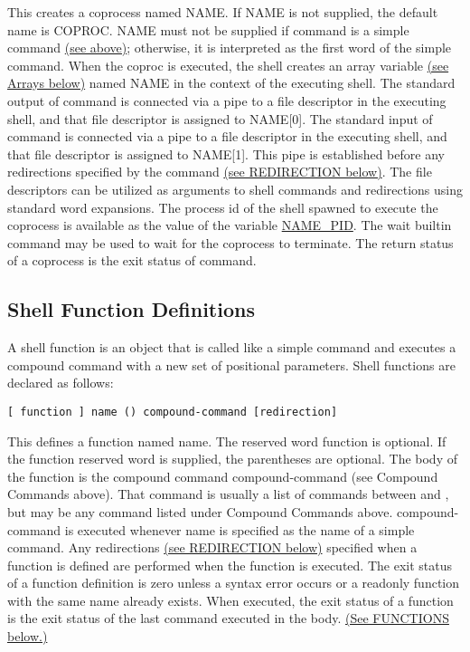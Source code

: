 \documentclass[11pt]{article}
\begin{document}
This creates a coprocess named NAME. If NAME is not supplied, the default name is COPROC. NAME must not be supplied if command is a simple command \hyperref[lst:if]{(see above)}; otherwise, it is interpreted as the first word of the simple command. When the coproc is executed, the shell creates an array variable \hyperref[sec:arrays]{(see Arrays below)} named NAME in the context of the executing shell. The standard output of command is connected via a pipe to a file descriptor in the executing shell, and that file descriptor is assigned to NAME[0]. The standard input of command is connected via a pipe to a file descriptor in the executing shell, and that file descriptor is assigned to NAME[1]. This pipe is established before any redirections specified by the command \hyperref[sec:redirection]{(see REDIRECTION below)}. The file descriptors can be utilized as arguments to shell commands and redirections using standard word expansions. The process id of the shell spawned to execute the coprocess is available as the value of the variable \url{NAME\_PID}. The wait builtin command may be used to wait for the coprocess to terminate.
The return status of a coprocess is the exit status of command.

\subsection{Shell Function Definitions}

A shell function is an object that is called like a simple command and executes a compound command with a new set of positional parameters. Shell functions are declared as follows:
\begin{lstlisting}
[ function ] name () compound-command [redirection]
\end{lstlisting}

This defines a function named name. The reserved word function is optional. If the function reserved word is supplied, the parentheses are optional. The body of the function is the compound command compound-command (see Compound Commands above). That command is usually a list of commands between { and }, but may be any command listed under Compound Commands above. compound-command is executed whenever name is specified as the name of a simple command. Any redirections \hyperref[sec:redirection]{(see REDIRECTION below)} specified when a function is defined are performed when the function is executed. The exit status of a function definition is zero unless a syntax error occurs or a readonly function with the same name already exists. When executed, the exit status of a function is the exit status of the last command executed in the body. \hyperref[sec:functions]{(See FUNCTIONS below.)}
\end{document}
